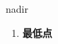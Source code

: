 
\begin{frame}
{\huge nadir}
\begin{center}
\begin{enumerate}\Large
  \item \textbf{最低点}
\end{enumerate}
\end{center}
\end{frame}

